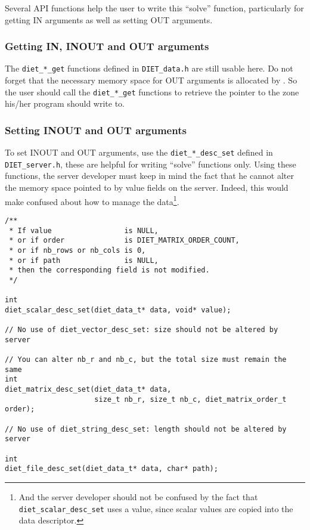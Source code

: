 Several API functions help the user to write this ``solve''
function, particularly for getting IN arguments as well as setting
OUT arguments.

\subsubsection*{Getting IN, INOUT and OUT arguments}

The \texttt{diet\_*\_get} functions defined in \texttt{DIET\_data.h} are still
usable here. Do not forget that the necessary memory space for OUT arguments is
allocated by \diet. So the user should call the \texttt{diet\_*\_get} functions
to retrieve the pointer to the zone his/her program should write to.

\subsubsection*{Setting INOUT and OUT arguments}

To set INOUT and OUT arguments, use the \texttt{diet\_*\_desc\_set} defined
in \texttt{DIET\_server.h}, these are helpful for writing ``solve''
functions only. Using these functions, the server developer must keep in
mind the fact that he cannot alter the memory space pointed to by
value fields on the server. Indeed, this would make \diet confused
about how to manage the data{\footnote{And the server developer
should not be confused by the fact that
\texttt{diet\_scalar\_desc\_set} uses a value, since scalar values
are copied into the data descriptor.}}.

{\footnotesize
\begin{verbatim}
/**
 * If value                 is NULL,
 * or if order              is DIET_MATRIX_ORDER_COUNT,
 * or if nb_rows or nb_cols is 0,
 * or if path               is NULL,
 * then the corresponding field is not modified.
 */

int
diet_scalar_desc_set(diet_data_t* data, void* value);

// No use of diet_vector_desc_set: size should not be altered by server

// You can alter nb_r and nb_c, but the total size must remain the same
int
diet_matrix_desc_set(diet_data_t* data,
                     size_t nb_r, size_t nb_c, diet_matrix_order_t order);

// No use of diet_string_desc_set: length should not be altered by server

int
diet_file_desc_set(diet_data_t* data, char* path);
\end{verbatim}
}


